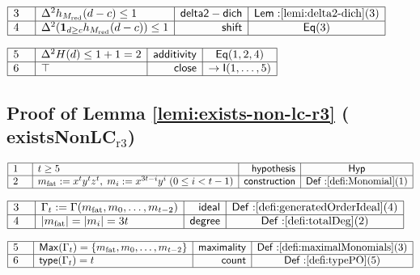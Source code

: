 \documentclass[11pt,reqno]{amsart}
\begin{document}
\nointerlineskip\noindent$%
\begin{array}{|m{0.5cm}|l|r|c|}
\hline
3 & \Delta^{2}h_{M_{\mathrm{red}}}(d-c)\le1 & \mathsf{delta2-dich} & \mathsf{%
Lem:}\ref{lemi:delta2-dich}(3) \\ \hline
4 & \Delta^{2}(\mathbf{1}_{d\ge c}h_{M_{\mathrm{red}}}(d-c))\le1 & \mathsf{%
shift} & \mathsf{Eq}(3) \\ \hline
\end{array}%
$

\nointerlineskip\noindent$%
\begin{array}{|m{0.5cm}|l|r|c|}
\hline
5 & \Delta^{2}H(d)\le1+1=2 & \mathsf{additivity} & \mathsf{Eq}(1,2,4) \\ 
\hline
6 & \top & \mathsf{close} & \to\mathsf{I}(1,\dots,5) \\ \hline
\end{array}%
$

\medskip

\subsection*{Proof of Lemma \protect\ref{lemi:exists-non-lc-r3} (\textsf{%
existsNonLC}$_{\mathrm{r3}}$)}

\noindent $%
\begin{array}{|m{0.5cm}|l|r|c|}
\hline
1 & t\geq 5 & \mathsf{hypothesis} & \mathsf{Hyp} \\ \hline
2 & m_{\mathrm{fat}}:=x^{t}y^{t}z^{t},\;m_{i}:=x^{3t-i}y^{i}\;(0\leq i<t-1)
& \mathsf{construction} & \mathsf{Def:}\ref{defi:Monomial}(1) \\ \hline
\end{array}%
$

\nointerlineskip\noindent$%
\begin{array}{|m{0.5cm}|l|r|c|}
\hline
3 & \Gamma_{t}:=\Gamma(m_{\mathrm{fat}},m_{0},\dots,m_{t-2}) & \mathsf{ideal}
& \mathsf{Def:}\ref{defi:generatedOrderIdeal}(4) \\ \hline
4 & |m_{\mathrm{fat}}|=|m_{i}|=3t & \mathsf{degree} & \mathsf{Def:}\ref%
{defi:totalDeg}(2) \\ \hline
\end{array}%
$

\nointerlineskip\noindent$%
\begin{array}{|m{0.5cm}|l|r|c|}
\hline
5 & \mathsf{Max}(\Gamma_{t})=\{m_{\mathrm{fat}},m_{0},\dots,m_{t-2}\} & 
\mathsf{maximality} & \mathsf{Def:}\ref{defi:maximalMonomials}(3) \\ \hline
6 & \mathsf{type}(\Gamma_{t})=t & \mathsf{count} & \mathsf{Def:}\ref%
{defi:typePO}(5) \\ \hline
\end{array}%
$
\end{document}

